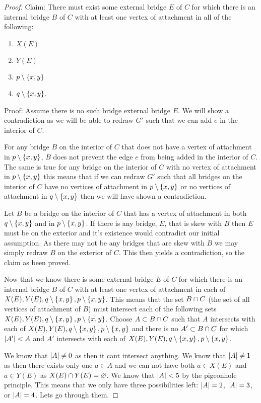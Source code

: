 \documentclass{article}
\begin{document}
\begin{proof}
	Claim: There must exist some external bridge $E$ of $C$ for which there is an internal bridge $B$ of $C$ with at least one vertex of attachment in all of the following:
	\begin{enumerate}
		\item $X(E)$
		\item $Y(E)$
		\item $p\setminus\left\{ {x,y} \right\}$
		\item $q\setminus\left\{ {x,y} \right\}$.
	\end{enumerate}

	Proof: Assume there is no such bridge external bridge $E$. We will show a contradiction as we will be able to redraw $G'$ such that we can add $e$ in the interior of $C$.
	
	For any bridge $B$ on the interior of $C$ that does not have a vertex of attachment in $p\setminus\left\{ {x,y} \right\}$, $B$ does not prevent the edge $e$ from being added in the interior of $C$. The same is true for any bridge on the interior of $C$ with no vertex of attachment in $p\setminus\left\{ {x,y} \right\}$ this means that if we can redraw $G'$ such that all bridges on the interior of $C$ have no vertices of attachment in $p\setminus\left\{ {x,y} \right\}$ or no vertices of attachment in $q\setminus\left\{ {x,y} \right\}$ then we will have shown a contradiction.
	
	Let $B$ be a bridge on the interior of $C$ that has a vertex of attachment in both $q\setminus\left\{ {x,y} \right\}$ and in $p\setminus\left\{ {x,y} \right\}$. If there is any bridge, $E$, that is skew with $B$ then $E$ must be on the exterior and it's existence would contradict our initial assumption. As there may not be any bridges that are skew with $B$ we may simply redraw $B$ on the exterior of $C$. This then yields a contradiction, so the claim as been proved.
	
	Now that we know there is some external bridge $E$ of $C$ for which there is an internal bridge $B$ of $C$ with at least one vertex of attachment in each of $X(E), Y(E), q\setminus\left\{ {x,y} \right\},p\setminus\left\{ {x,y} \right\}$. This means that the set $B\cap C$ (the set of all vertices of attachment of $B$) must intersect each of the following sets $X(E),Y(E),q\setminus\left\{ {x,y} \right\},p\setminus\left\{ {x,y} \right\}$. Choose $A\subset B\cap C$ such that $A$ intersects with each of $X(E),Y(E),q\setminus\left\{ {x,y} \right\},p\setminus\left\{ {x,y} \right\}$ and there is no $A'\subset B\cap C$ for which $\left| {A'} \right| < A$ and $A'$ intersects with each of $X(E),Y(E),q\setminus\left\{ {x,y} \right\},p\setminus\left\{ {x,y} \right\}$.
	
	We know that $\left| {A} \right|\not=0$ as then it cant intersect anything. We know that $\left| {A} \right|\not= 1$ as then there exists only one $a\in A$ and we can not have both $a\in X(E)$ and $a\in Y(E)$ as $X(E)\cap Y(E) = \varnothing$. We know that $\left| {A} \right| < 5$ by the pigeonhole principle. This means that we only have three possibilities left: $\left| {A} \right| = 2$, $\left| {A} \right| = 3$, or $\left| {A} \right| = 4$. Lets go through them.
	

\end{proof}
\end{document}

